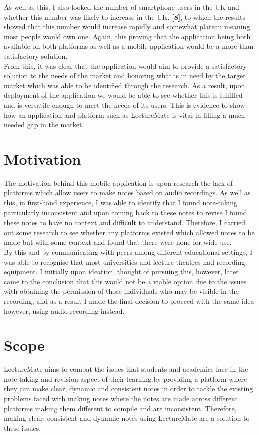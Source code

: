 \documentclass[oneside]{report}
\begin{document}
As well as this, I also looked the number of smartphone users in the UK and whether this number was likely to increase in the UK, \textbf{[8]}, to which the results showed that this number would increase rapidly and somewhat plateau meaning most people would own one. Again, this proving that the application being both available on both platforms as well as a mobile application would be a more than satisfactory solution.\\

From this, it was clear that the application would aim to provide a satisfactory solution to the needs of the market and honoring what is in need by the target market which was able to be identified through the research. As a result, upon deployment of the application we would be able to see whether this is fulfilled and is versatile enough to meet the needs of its users. This is evidence to show how an application and platform such as LectureMate is vital in filling a much needed gap in the market.

	\section{Motivation}
The motivation behind this mobile application is upon research the lack of platforms which allow users to make notes based on audio recordings. As well as this, in first-hand experience, I was able to identify that I found note-taking particularly inconsistent and upon coming back to these notes to revise I found these notes to have no context and difficult to understand. Therefore, I carried out some research to see whether any platforms existed which allowed notes to be made but with some context and found that there were none for wide use.\\

By this and by communicating with peers among different educational settings, I was able to recognise that most universities and lecture theatres had recording equipment. I initially upon ideation, thought of pursuing this, however, later came to the conclusion that this would not be a viable option due to the issues with obtaining the permission of those individuals who may be visible in the recording, and as a result I made the final decision to proceed with the same idea however, using audio recording instead.

	\section{Scope}
LectureMate aims to combat the issues that students and academics face in the note-taking and revision aspect of their learning by providing a platform where they can make clear, dynamic and consistent notes in order to tackle the existing problems faced with making notes where the notes are made across different platforms making them different to compile and are inconsistent. Therefore, making clear, consistent and dynamic notes using LectureMate are a solution to these issues.
\end{document}
